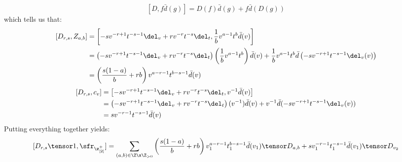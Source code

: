 \begin{enumerate}
\begin{enumerate}
                                $$[D, f \bar{d}(g)] = D(f) \bar{d}(g) + f \bar{d}( D(g) )$$
                            which tells us that:
                                $$
                                    \begin{aligned}
                                        [D_{r, s}, Z_{a, b}] & = \left[ -s v^{-r + 1} t^{-s - 1} \del_v + r v^{-r} t^{-s} \del_t, \frac1b v^{a - 1} t^b \bar{d}(v) \right]
                                        \\
                                        & = \left( -s v^{-r + 1} t^{-s - 1} \del_v + r v^{-r} t^{-s} \del_t \right)\left( \frac1b v^{a - 1} t^b \right) \bar{d}(v) + \frac1b v^{a - 1} t^b \bar{d}\left( -s v^{-r + 1} t^{-s - 1} \del_v(v) \right)
                                        \\
                                        & = \left( \frac{s(1 - a)}{b} + rb  \right) v^{a - r - 1} t^{b - s - 1} \bar{d}(v)
                                    \end{aligned}
                                $$
                                $$
                                    \begin{aligned}
                                        [D_{r, s}, c_v] & = \left[ -s v^{-r + 1} t^{-s - 1} \del_v + r v^{-r} t^{-s} \del_t, v^{-1} \bar{d}(v) \right]
                                        \\
                                        & = \left( -s v^{-r + 1} t^{-s - 1} \del_v + r v^{-r} t^{-s} \del_t \right)(v^{-1}) \bar{d}(v) + v^{-1} \bar{d}( -s v^{-r + 1} t^{-s - 1} \del_v(v) )
                                        \\
                                        & = s v^{-r - 1} t^{-s - 1} \bar{d}(v)
                                    \end{aligned}
                                $$
                            Putting everything together yields:
                                $$[D_{r, s} \tensor 1, \sfr_{\z_{[2]}^+}] = \sum_{(a, b) \in \Z \x \Z_{> 0}} \left( \frac{s(1 - a)}{b} + rb  \right) v_1^{a - r - 1} t_1^{b - s - 1} \bar{d}(v_1) \tensor D_{a, b} + s v_1^{-r - 1} t_1^{-s - 1} \bar{d}(v_1) \tensor D_{v_2}$$


\end{enumerate}
\end{enumerate}
